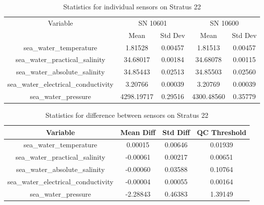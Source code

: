 \begin{table}[h]
\centering
\begin{tabular}{|c|c|c|c|c|}
\hline
Variable & \multicolumn{2}{c|}{SN 10601} & \multicolumn{2}{c|}{SN 10600} \\
& Mean & Std Dev & Mean & Std Dev \\
\hline
sea\_water\_temperature & 1.81528 & 0.00457 & 1.81513 & 0.00457 \\
sea\_water\_practical\_salinity & 34.68017 & 0.00184 & 34.68078 & 0.00115 \\
sea\_water\_absolute\_salinity & 34.85443 & 0.02513 & 34.85503 & 0.02560 \\
sea\_water\_electrical\_conductivity & 3.20766 & 0.00039 & 3.20769 & 0.00039 \\
sea\_water\_pressure & 4298.19717 & 0.29516 & 4300.48560 & 0.35779 \\
\hline
\end{tabular}
\caption{Statistics for individual sensors on Stratus 22}
\end{table}

\begin{table}[h]
\centering
\begin{tabular}{|c|c|c|c|}
\hline
Variable & Mean Diff & Std Diff & QC Threshold \\
\hline
sea\_water\_temperature & 0.00015 & 0.00646 & 0.01939 \\
sea\_water\_practical\_salinity & -0.00061 & 0.00217 & 0.00651 \\
sea\_water\_absolute\_salinity & -0.00060 & 0.03588 & 0.10764 \\
sea\_water\_electrical\_conductivity & -0.00004 & 0.00055 & 0.00164 \\
sea\_water\_pressure & -2.28843 & 0.46383 & 1.39149 \\
\hline
\end{tabular}
\caption{Statistics for difference between sensors on Stratus 22}
\end{table}
